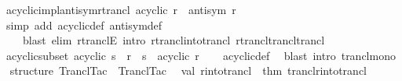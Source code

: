 \begin{isabellebody}
\isanewline
{}\isamarkupfalse%
\ acyclic{\isacharunderscore}{\kern0pt}impl{\isacharunderscore}{\kern0pt}antisym{\isacharunderscore}{\kern0pt}rtrancl{\isacharcolon}{\kern0pt}\ {\isachardoublequoteopen}acyclic\ r\ {\isasymLongrightarrow}\ antisym\ {\isacharparenleft}{\kern0pt}r\isactrlsup {\isacharasterisk}{\kern0pt}{\isacharparenright}{\kern0pt}{\isachardoublequoteclose}\isanewline
%
\isadelimproof
\ \ %
\endisadelimproof
%
\isatagproof
{}\isamarkupfalse%
\ {\isacharparenleft}{\kern0pt}simp\ add{\isacharcolon}{\kern0pt}\ acyclic{\isacharunderscore}{\kern0pt}def\ antisym{\isacharunderscore}{\kern0pt}def{\isacharparenright}{\kern0pt}\isanewline
\ \ \ \ {\isacharparenleft}{\kern0pt}blast\ elim{\isacharcolon}{\kern0pt}\ rtranclE\ intro{\isacharcolon}{\kern0pt}\ rtrancl{\isacharunderscore}{\kern0pt}into{\isacharunderscore}{\kern0pt}trancl{}\ rtrancl{\isacharunderscore}{\kern0pt}trancl{\isacharunderscore}{\kern0pt}trancl{\isacharparenright}{\kern0pt}%
\endisatagproof
{\isafoldproof}%
%
\isadelimproof
\isanewline
%
\endisadelimproof
\isanewline
\isanewline
\isanewline
{}\isamarkupfalse%
\ acyclic{\isacharunderscore}{\kern0pt}subset{\isacharcolon}{\kern0pt}\ {\isachardoublequoteopen}acyclic\ s\ {\isasymLongrightarrow}\ r\ {\isasymsubseteq}\ s\ {\isasymLongrightarrow}\ acyclic\ r{\isachardoublequoteclose}\isanewline
%
\isadelimproof
\ \ %
\endisadelimproof
%
\isatagproof
{}\isamarkupfalse%
\ acyclic{\isacharunderscore}{\kern0pt}def\ \isamarkupfalse%
\ {\isacharparenleft}{\kern0pt}blast\ intro{\isacharcolon}{\kern0pt}\ trancl{\isacharunderscore}{\kern0pt}mono{\isacharparenright}{\kern0pt}%
\endisatagproof
{\isafoldproof}%
%
\isadelimproof
%
\endisadelimproof
%
\isadelimdocument
%
\endisadelimdocument
%
\isatagdocument
%
\isamarkuptrue%
%
\endisatagdocument
{\isafolddocument}%
%
\isadelimdocument
%
\endisadelimdocument
%
\isadelimML
%
\endisadelimML
%
\isatagML
{}\isamarkupfalse%
\ {\isacartoucheopen}\isanewline
structure\ Trancl{\isacharunderscore}{\kern0pt}Tac\ {\isacharequal}{\kern0pt}\ Trancl{\isacharunderscore}{\kern0pt}Tac\isanewline
{\isacharparenleft}{\kern0pt}\isanewline
\ \ val\ r{\isacharunderscore}{\kern0pt}into{\isacharunderscore}{\kern0pt}trancl\ {\isacharequal}{\kern0pt}\ {\isacharat}{\kern0pt}{\isacharbraceleft}{\kern0pt}thm\ trancl{\isachardot}{\kern0pt}r{\isacharunderscore}{\kern0pt}into{\isacharunderscore}{\kern0pt}trancl{\isacharbraceright}{\kern0pt}{\isacharsemicolon}{\kern0pt}\isanewline

\end{isabellebody}
